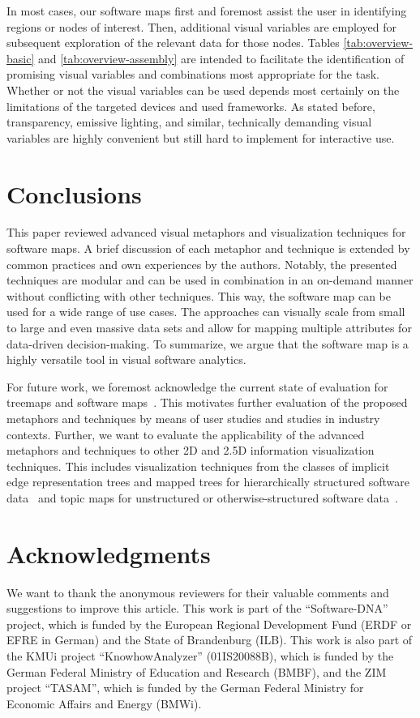 \documentclass{svjour3}                     %
\begin{document}
In most cases, our software maps first and foremost assist the user in identifying regions or nodes of interest.
Then, additional visual variables are employed for subsequent exploration of the relevant data for those nodes.
Tables \ref{tab:overview-basic} and \ref{tab:overview-assembly} are intended to facilitate the identification of promising visual variables and combinations most appropriate for the task.
Whether or not the visual variables can be used depends most certainly on the limitations of the targeted devices and used frameworks. 
As stated before, transparency, emissive lighting, and similar, technically demanding visual variables are highly convenient but still hard to implement for interactive use.

\section{Conclusions}
\label{JOV:Sec:Conclusions}
This paper reviewed advanced visual metaphors and visualization techniques for software maps.
A brief discussion of each metaphor and technique is extended by common practices and own experiences by the authors.
Notably, the presented techniques are modular and can be used in combination in an on-demand manner without conflicting with other techniques.
This way, the software map can be used for a wide range of use cases.
The approaches can visually scale from small to large and even massive data sets and allow for mapping multiple attributes for data-driven decision-making.
To summarize, we argue that the software map is a highly versatile tool in visual software analytics.

For future work, we foremost acknowledge the current state of evaluation for treemaps and software maps~\citep{fiedler2020-treemap-evaluation}.
This motivates further evaluation of the proposed metaphors and techniques by means of user studies and studies in industry contexts.
Further, we want to evaluate the applicability of the advanced metaphors and techniques to other 2D and 2.5D information visualization techniques.
This includes visualization techniques from the classes of implicit edge representation trees and mapped trees for hierarchically structured software data~\citep{scheibel2020-treemaptaxonomy} and topic maps for unstructured or otherwise-structured software data~\citep{atzberger2021-softwareforest}.

\section*{Acknowledgments}
We want to thank the anonymous reviewers for their valuable comments and suggestions to improve this article.
This work is part of the \enquote{Software-DNA} project, which is funded by the European Regional Development Fund (ERDF or EFRE in German) and the State of Brandenburg (ILB).
This work is also part of the KMUi project \enquote{KnowhowAnalyzer} (01IS20088B), which is funded by the German Federal Ministry of Education and Research (BMBF), and
the ZIM project \enquote{TASAM}, which is funded by the German Federal Ministry for Economic Affairs and Energy (BMWi).



\end{document}
